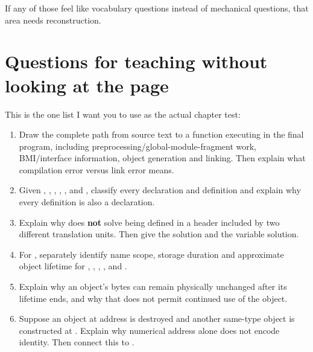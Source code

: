 If any of those feel like vocabulary questions instead of mechanical questions, that area needs reconstruction.

\section{Questions for teaching without looking at the page}\label{01-foundations-i-ch004-questions-for-teaching-without-looking-at-the-page}

\hypertarget{01-foundations-i-ch004-questions-for-teaching-without-looking-at-the-page}{}

This is the one list I want you to use as the actual chapter test:

\begin{enumerate}
\def\labelenumi{\arabic{enumi}.}
\item
  Draw the complete path from  source text to a function executing in the final program, including preprocessing/global-module-fragment work, BMI/interface information, object generation and linking. Then explain what compilation error versus link error means.
\item
  Given , , , , , and , classify every declaration and definition and explain why every definition is also a declaration.
\item
  Explain why  does \textbf{not} solve  being defined in a header included by two different translation units. Then give the  solution and the  variable solution.
\item
  For , separately identify name scope, storage duration and approximate object lifetime for , , , , and .
\item
  Explain why an object's bytes can remain physically unchanged after its lifetime ends, and why that does not permit continued use of the object.
\item
  Suppose an object at address  is destroyed and another same-type object is constructed at . Explain why numerical address alone does not encode identity. Then connect this to .

\end{enumerate}
